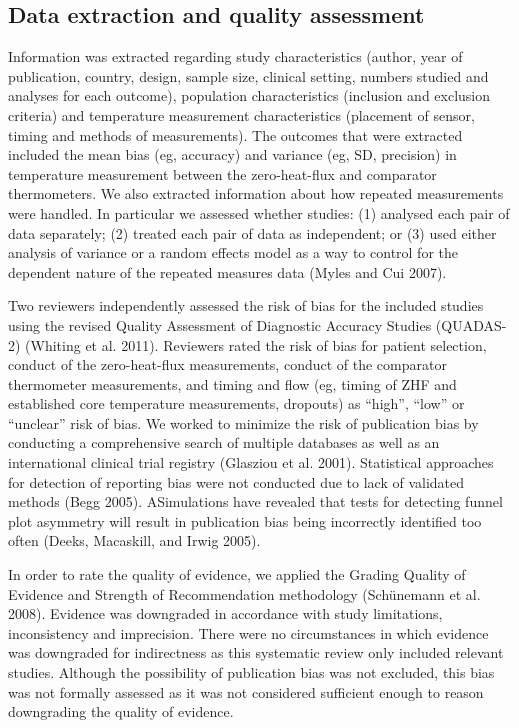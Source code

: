 \documentclass[smallextended]{svjour3}       %
\begin{document}
\hypertarget{data-extraction-and-quality-assessment}{%
\subsection{Data extraction and quality
assessment}\label{data-extraction-and-quality-assessment}}

Information was extracted regarding study characteristics (author, year
of publication, country, design, sample size, clinical setting, numbers
studied and analyses for each outcome), population characteristics
(inclusion and exclusion criteria) and temperature measurement
characteristics (placement of sensor, timing and methods of
measurements). The outcomes that were extracted included the mean bias
(eg, accuracy) and variance (eg, SD, precision) in temperature
measurement between the zero-heat-flux and comparator thermometers. We
also extracted information about how repeated measurements were handled.
In particular we assessed whether studies: (1) analysed each pair of
data separately; (2) treated each pair of data as independent; or (3)
used either analysis of variance or a random effects model as a way to
control for the dependent nature of the repeated measures data (Myles
and Cui 2007).

Two reviewers independently assessed the risk of bias for the included
studies using the revised Quality Assessment of Diagnostic Accuracy
Studies (QUADAS-2) (Whiting et al. 2011). Reviewers rated the risk of
bias for patient selection, conduct of the zero-heat-flux measurements,
conduct of the comparator thermometer measurements, and timing and flow
(eg, timing of ZHF and established core temperature measurements,
dropouts) as ``high'', ``low'' or ``unclear'' risk of bias. We worked to
minimize the risk of publication bias by conducting a comprehensive
search of multiple databases as well as an international clinical trial
registry (Glasziou et al. 2001). Statistical approaches for detection of
reporting bias were not conducted due to lack of validated methods (Begg
2005). ASimulations have revealed that tests for detecting funnel plot
asymmetry will result in publication bias being incorrectly identified
too often (Deeks, Macaskill, and Irwig 2005).

In order to rate the quality of evidence, we applied the Grading Quality
of Evidence and Strength of Recommendation methodology (Schünemann et
al. 2008). Evidence was downgraded in accordance with study limitations,
inconsistency and imprecision. There were no circumstances in which
evidence was downgraded for indirectness as this systematic review only
included relevant studies. Although the possibility of publication bias
was not excluded, this bias was not formally assessed as it was not
considered sufficient enough to reason downgrading the quality of
evidence.
\end{document}
